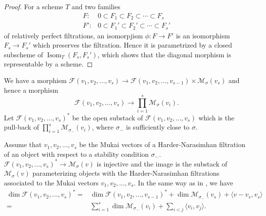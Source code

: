\documentclass[leqno,11pt]{amsart}
\def\dim{\mathop{\mathrm{dim}}\nolimits}
\def\Isom{\mathop{\mathrm{Isom}}\nolimits}
\theoremstyle{definition}
\def\FF{\ensuremath{\mathcal F}}
\def\MM{\ensuremath{\mathcal M}}
\begin{document}
\begin{proof}
For a scheme $T$ and two families
\begin{equation}
\begin{split}
F: & 0 \subset F_1 \subset F_2 \subset \cdots \subset F_s\\
F': & 0 \subset F_1' \subset F_2' \subset \cdots \subset F_s'
\end{split}
\end{equation} 
of relatively perfect filtrations,
an isomorpjism $\phi:F \to F'$ is
an isomorphism $F_s \to F_s'$ which preserves the filtration. 
Hence it is parametrized by a closed subscheme of
$\Isom_T(F_s,F_s')$, which shows that the diagonal morphism is representable
by a scheme.
\end{proof}



We have a morphism
$\FF(v_1,v_2,...,v_s) \to \FF(v_1,v_2,...,v_{s-1}) \times \MM_{\sigma}(v_s)$
and hence a morphism
$$
\FF(v_1,v_2,...,v_s) \to \prod_{i=1}^s \MM_{\sigma}(v_i).
$$
Let $\FF(v_1,v_2,...,v_s)^*$ be the open substack of
$\FF(v_1,v_2,...,v_s)$ which is the pull-back of
$\prod_{i=1}^s \MM_{\sigma_-}(v_i)$, where $\sigma_-$ is sufficiently close to
$\sigma$.



Assume that $v_1,v_2,...,v_s$ be the Mukai vectors of a Harder-Narasimhan
filtration of an object with respect to a stability condition $\sigma_-$.
$\FF(v_1,v_2,...,v_s)^* \to \MM_{\sigma}(v)$ is injective and the image
is the substack of $\MM_\sigma(v)$ parameterizing objects
with the Harder-Narasimhan filtrations associated to the Mukai vectors
$v_1,v_2,...,v_s$.
In the same way as in \cite[Prop. 6.2]{Bri12},
we have
\begin{equation}
\begin{split}
\dim \FF(v_1,v_2,...,v_s)^*=&
\dim \FF(v_1,v_2,...,v_{s-1})^*+\dim \MM_{\sigma_-}(v_s)+
\langle v-v_s,v_s \rangle\\
=& \sum_{i=1}^s \dim \MM_{\sigma_-}(v_i)+\sum_{i<j}\langle v_i,v_j \rangle.
\end{split}
\end{equation}
\end{document}
